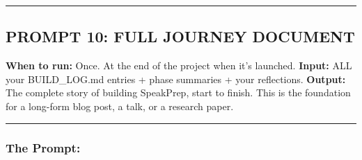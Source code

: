 \documentclass[
  11pt,
]{article}
\begin{document}
\begin{center}\rule{0.5\linewidth}{0.5pt}\end{center}

\hypertarget{prompt-10-full-journey-document}{%
\subsection{PROMPT 10: FULL JOURNEY
DOCUMENT}\label{prompt-10-full-journey-document}}

\textbf{When to run:} Once. At the end of the project when it's
launched. \textbf{Input:} ALL your BUILD\_LOG.md entries + phase
summaries + your reflections. \textbf{Output:} The complete story of
building SpeakPrep, start to finish. This is the foundation for a
long-form blog post, a talk, or a research paper.

\begin{center}\rule{0.5\linewidth}{0.5pt}\end{center}

\hypertarget{the-prompt-9}{%
\subsubsection{The Prompt:}\label{the-prompt-9}}
\end{document}
